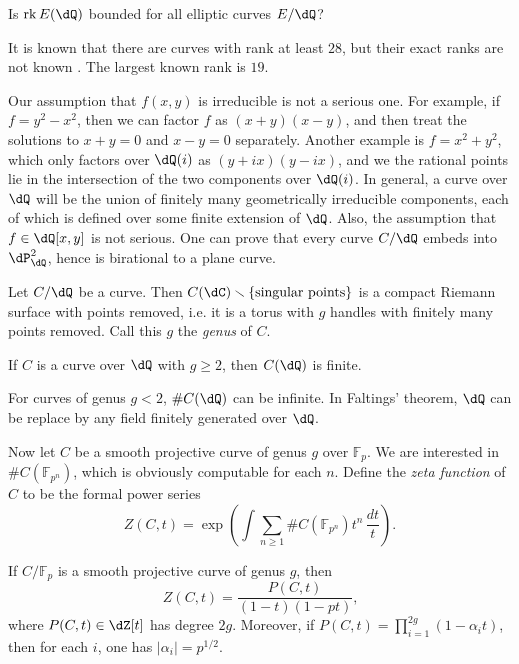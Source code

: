 \documentclass{article}
\begin{document}
\begin{question}
Is $\rank E(\dQ)$ bounded for all elliptic curves 
$E/\dQ$?
\end{question}

It is known that there are curves with rank at least $28$, but their exact 
ranks are not known \cite{du}. The largest known rank is $19$. 

Our assumption that $f(x,y)$ is irreducible is not a serious one. For example, 
if $f=y^2-x^2$, then we can factor $f$ as $(x+y)(x-y)$, and then treat the 
solutions to $x+y=0$ and $x-y=0$ separately. Another example is $f=x^2+y^2$, 
which only factors over $\dQ(i)$ as $(y+i x)(y-i x)$, and we the rational 
points lie in the intersection of the two components over $\dQ(i)$. In general, 
a curve over $\dQ$ will be the union of finitely many geometrically irreducible 
components, each of which is defined over some finite extension of $\dQ$. Also, 
the assumption that $f\in \dQ[x,y]$ is not serious. One can prove that every 
curve $C/\dQ$ embeds into $\dP^2_\dQ$, hence is birational to a plane curve. 

Let $C/\dQ$ be a curve. Then 
$C(\dC)\smallsetminus \{\text{singular points}\}$ is a compact Riemann 
surface with points removed, i.e. it is a torus with $g$ handles with finitely 
many points removed. Call this $g$ the \emph{genus} of $C$. 

\begin{theorem}
If $C$ is a curve over $\dQ$ with $g\geqslant 2$, then $C(\dQ)$ 
is finite. 
\end{theorem}

For curves of genus $g<2$, $\# C(\dQ)$ can be infinite. In Faltings' 
theorem, $\dQ$ can be replace by any field finitely generated over 
$\dQ$. 

Now let $C$ be a smooth projective curve of genus $g$ over $\mathbb{F}_p$. 
We are interested in $\#C(\mathbb{F}_{p^n})$, which is obviously computable 
for each $n$. Define the \emph{zeta function} of $C$ to be the formal power 
series 
\[
  Z(C,t) = \exp\left( \int\sum_{n\geqslant 1} \# C(\mathbb{F}_{p^n}) t^n\, \frac{dt}{t}\right) \text{.}
\]

\begin{theorem}[Weil]\label{thm:Weil-curve}
If $C/\mathbb{F}_p$ is a smooth projective curve of genus $g$, then 
\[
  Z(C,t) = \frac{P(C,t)}{(1-t)(1-p t)} \text{,}
\]
where $P(C,t)\in \dZ[t]$ has degree $2 g$. Moreover, if 
$P(C,t) = \prod_{i=1}^{2 g} (1-\alpha_i t)$, then for each $i$, one has 
$|\alpha_i|=p^{1/2}$. 
\end{theorem}
\end{document}
